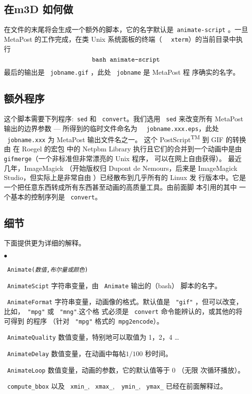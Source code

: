 \documentclass[a4paper,12pt]{article}
\newlength{\mmfontsize}
\newcommand{\listparam}{\setlength{\parsep}{\parskip}
 \setlength{\itemsep}{0ex plus 0.1ex}
 \setlength{\labelwidth}{2\mmfontsize}
 \setlength{\labelsep}{.5\mmfontsize}
 \setlength{\topsep}{0pt}
 \setlength{\partopsep}{0pt}
 \setlength{\leftmargin}{2\mmfontsize}
}
\begin{document}
\subsection{ 在m3D 如何做} 
在文件的末尾将会生成一个额外的脚本，它的名字默认是~{\tt animate-script}
。一旦 MetaPost  的工作完成，在类 Unix 系统面板的终端（ ~{\tt
  xterm}）的当前目录中执行 
$$
\hbox{\tt bash animate-script}
$$
 最后的输出是 ~{\tt jobname.gif} ，此处 ~{\tt jobname} 是 MetaPost 程
 序确实的名字。 

\subsection{额外程序}
这个脚本需要下列程序:~{\tt sed} 和 ~{\tt convert}。我们选用 ~{\tt sed}
来改变所有 MetaPost  输出的边界参数 --- 所得到的临时文件命名为 ~{\tt
  jobname.xxx.eps}，此处 ~{\tt jobname.xxx} 为 MetaPost 输出文件名之一。 
这个 PostScript\textsuperscript{TM}  到 GIF 的转换由 在 Roegel 的宏包
中的 Netpbm Library 执行且它们的合并到一个动画中是由  ~{\tt
  gifmerge}（一个非标准但非常漂亮的 Unix 程序， 可以在网上自由获得）。
最近几年，ImageMagick （开始版权归  Dupont de Nemours，后来是
ImageMagick Studio，但实际上是非常自由 ）已经散布到几乎所有的 Linux 发
行版本中。它是一个把任意东西转成所有东西甚至动画的高质量工具。由前面脚
本引用的其中 一个基本的控制序列是  ~{\tt convert}。


\subsection{细节}
下面提供更为详细的解释。
\begin{list}{$\bullet$}{\listparam}
\item~{\tt Animate({\it  数值},{\it 布尔量或颜色})}
\item~{\tt AnimateScipt} 字符串变量，由 ~{\tt Animate} 输出的（bash）
  脚本的名字。
\item~{\tt AnimateFormat} 字符串变量，动画像的格式。默认值是
  ~{\tt"gif"} ，但可以改变，比如，~{\tt "mpg"} 或 ~{\tt "mng"}.这个格
  式必须是 ~{\tt convert} 命令能辨认的，或其他的将可得到        的程序
  （针对 ~{\tt "mpg"} 格式的~{\tt mpg2encode}）。  
\item~{\tt AnimateQuality} 数值变量，特别地可以取值为 1，2，4 \dots 
\item~{\tt AnimateDelay} 数值变量，在动画中每帖$1/100$ 秒时间。
\item~{\tt AnimateLoop} 数值变量，动画的参数，它的默认值等于 0 （无限
  次循环播放）。
\item~{\tt compute\_bbox} 以及 ~{\tt xmin\_}, ~{\tt xmax\_},~{\tt
    ymin\_}, ~{\tt ymax\_} 已经在前面解释过。 
\end{list}
  
\end{document}
